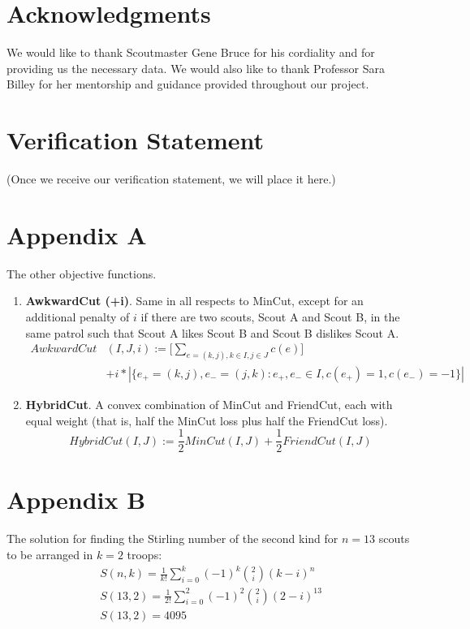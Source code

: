 \documentclass{amsart}
\theoremstyle{definition}
\theoremstyle{remark}
\numberwithin{equation}{section}
\begin{document}
\section*{Acknowledgments}
We would like to thank Scoutmaster Gene Bruce for his cordiality and for providing us the necessary data. We would also like to thank Professor Sara Billey for her mentorship and guidance provided throughout our project. 

\section*{Verification Statement}
(Once we receive our verification statement, we will place it here.)

\section*{Appendix A}
The other objective functions.

\begin{enumerate}
    \item \textbf{AwkwardCut (+i)}. Same in all respects to MinCut, except for an additional penalty of $i$ if there are two scouts, Scout A and Scout B, in the same patrol such that Scout A likes Scout B and Scout B dislikes Scout A.
    \begin{equation*}
        \begin{split}
            AwkwardCut&(I, J, i) := \Bigg[ \sum_{e = (k, j), k \in I, j \in J}^{} c(e) \Bigg] \\
            &+ i * \left\vert{\{e_+ = (k,j), e_- = (j, k) : e_+, e_- \in I, c(e_+) = 1, c(e_-) = -1\}}\right\vert
        \end{split}
    \end{equation*}

\item \textbf{HybridCut}. A convex combination of MinCut and FriendCut, each with equal weight (that is, half the MinCut loss plus half the FriendCut loss).
    \begin{equation*}
        HybridCut(I, J) := \frac{1}{2}MinCut(I, J) + \frac{1}{2}FriendCut(I, J)
    \end{equation*}
\end{enumerate}

\section*{Appendix B}
The solution for finding the Stirling number of the second kind for $n = 13$ scouts to be arranged in $k = 2$ troops:
\begin{gather*}
	S(n,k) = \frac{1}{k!} \sum_{i=0}^{k}(-1)^k {2 \choose i} (k - i)^{n} \\
	S(13,2) = \frac{1}{2!} \sum_{i=0}^{2}(-1)^2 {2 \choose i} (2 - i)^{13} \\
	S(13, 2) = 4095
\end{gather*}
\end{document}
